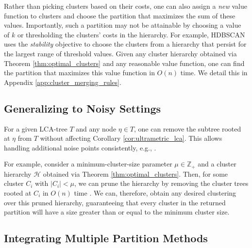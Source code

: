 Rather than picking clusters based on their costs, one can also assign a \emph{new} value function to clusters and choose the partition that maximizes the sum of these values. Importantly, such a partition may not be attainable by choosing a value of $k$ or thresholding the clusters' costs in the hierarchy. For example, HDBSCAN uses the \emph{stability} objective to choose the clusters from a hierarchy that persist for the largest range of threshold values. Given any cluster hierarchy obtained via Theorem \ref{thm:optimal_clusters} and any reasonable value function, one can find the partition that maximizes this value function in $O(n)$ time. We detail this in Appendix \ref{app:cluster_merging_rules}. 


\subsection{Generalizing to Noisy Settings}

For a given LCA-tree $T$ and any node $\eta \in T$, one can remove the subtree rooted at $\eta$ from $T$ without affecting Corollary \ref{cor:ultrametric_lca}.
This allows handling additional noise points consistently, e.g., \citet{k-center-q-coverage, hdbscan}.


For example, consider a minimum-cluster-size parameter $\mu \in \mathbb{Z}_{+}$ and a cluster hierarchy $\mathcal{H}$ obtained via Theorem \ref{thm:optimal_clusters}. Then, for some cluster $C_i$ with $|C_i| < \mu$, we can prune the hierarchy by removing the cluster trees rooted at $C_i$ in $O(n)$ time \citep{hdbscan}. We can, therefore, obtain any desired clustering over this pruned hierarchy, guaranteeing that every cluster in the returned partition will have a size greater than or equal to the minimum cluster size. 


\subsection{Integrating Multiple Partition Methods} \label{sec:integrating_multiple_partition_methods}

